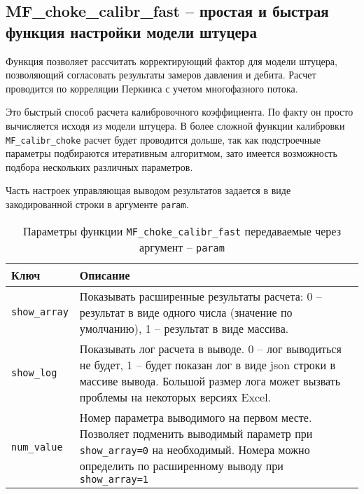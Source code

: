 \subsection{MF\_choke\_calibr\_fast – простая и быстрая функция настройки модели штуцера}
Функция позволяет рассчитать корректирующий фактор для модели штуцера, позволяющий согласовать результаты замеров давления и дебита. Расчет проводится по корреляции Перкинса \cite{Perkins_1993} с учетом многофазного потока.  

Это быстрый способ расчета калибровочного коэффициента. По факту он просто вычисляется исходя из модели штуцера.
В более сложной функции калибровки \texttt{MF_calibr_choke} расчет будет проводится дольше, так как подстроечные параметры подбираются итеративным алгоритмом, зато имеется возможность подбора нескольких различных параметров.


Часть настроек управляющая выводом результатов задается в виде закодированной строки в аргументе \texttt{param}.

\begin{table}[H]
	\caption{Параметры функции  \texttt{MF_choke_calibr_fast} передаваемые через аргумент -- \texttt{param}}
	\label{table:param_list}
	\begin{tabular}{p{}p{}}
		\hline
		Ключ & Описание  \\ \hline
		\texttt{show_array} & Показывать расширенные результаты расчета: 0 -- результат в виде одного числа (значение по умолчанию), 1 -- результат в виде массива.    \\ \hline
		
		\texttt{show_log} & Показывать лог расчета в выводе. 0 -- лог выводиться не будет, 1 -- будет показан лог в виде json строки в массиве вывода. Большой размер лога может вызвать проблемы на некоторых версиях Excel.   \\ \hline
		
		\texttt{num_value} & Номер параметра выводимого на первом месте. Позволяет подменить выводимый параметр при \texttt{show_array=0} на необходимый. Номера можно определить по расширенному выводу при \texttt{show_array=1}  \\ \hline
	\end{tabular}
\end{table}

